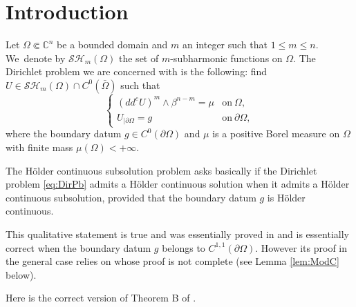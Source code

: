 \documentclass[JEP,XML,SOM,Unicode]{cedram}
\theoremstyle{definition}
\newcommand{\C}{\mathbb{C}}
\begin{document}
\section{Introduction}
Let $\Omega \Subset \C^n$ be a bounded domain and $m$ an integer such that $1 \leq m \leq n$. We~deno\-te by $\mathcal{SH}_m (\Omega)$ the set of $m$-subharmonic functions on $\Omega$. The Dirichlet problem we are concerned with is the following: find $U \in \mathcal{SH}_m (\Omega) \cap C^0 (\bar{\Omega})$ such that
\begin{equation}\label{eq:DirPb}
\begin{cases}
(dd^c U)^m \wedge \beta^{n - m} = \mu &\text{on}\ \Omega, \\
U_{\mid \partial \Omega} = g & \text{on}\ \partial \Omega,
\end{cases}
\end{equation}
where the boundary datum $g \in C^0 (\partial \Omega)$ and $\mu$ is a positive Borel measure on $\Omega$ with finite mass $\mu (\Omega) < + \infty$.

The Hölder continuous subsolution problem asks basically if the Dirichlet problem \eqref{eq:DirPb} admits a Hölder continuous solution when it admits a Hölder continuous subsolution, provided that the boundary datum $g$ is Hölder continuous.

This qualitative statement is true and was essentially proved in \cite[Th.\,B]{BZ20} and is essentially correct when the boundary datum $g$ belongs to $C^{1,1} (\partial \Omega)$. However its proof in the general case relies on \cite[Lem.\,4.2]{BZ20} whose proof is not complete (see Lemma \ref{lem:ModC} below).

Here is the correct version of Theorem B of \cite{BZ20}.
\end{document}
